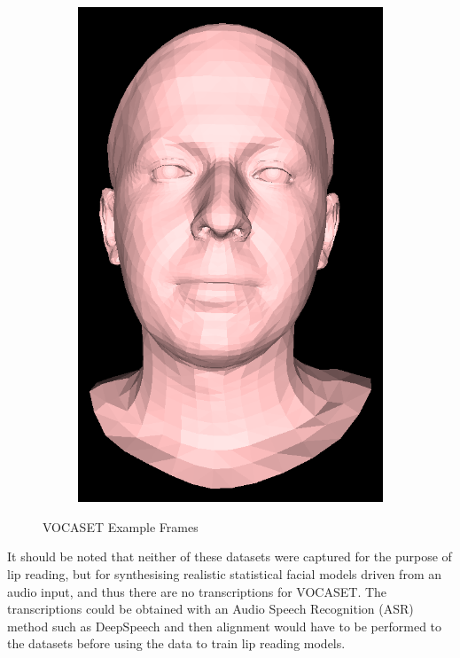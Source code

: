 \begin{figure}[h]
\begin{subfigure}[b]{0.19\textwidth}
        \includegraphics[width=\textwidth]{figures/voca_exp/vocaset_exp5.png}
    \end{subfigure}
    \caption{VOCASET Example Frames \cite{Cudeiro2019}}\label{fig:VOCASET_example}
\end{figure}

It should be noted that neither of these datasets were captured for the purpose of lip reading, but for synthesising realistic statistical facial models driven from an audio input, and thus there are no transcriptions for VOCASET.
The transcriptions could be obtained with an Audio Speech Recognition (ASR) method such as DeepSpeech \cite{Hannun2014} and then alignment would have to be performed to the datasets before using the data to train lip reading models.

